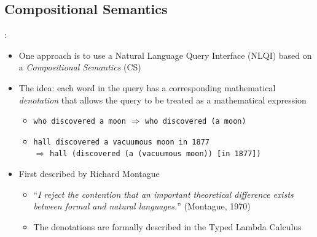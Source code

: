 \documentclass[logoontitle,tabu,supertabular,aspectratio=43]{preney-uwindsor-beamer}
\begin{document}
    \subsection{Compositional Semantics}
    \begin{frame}{\insertsection: \insertsubsection}
        \begin{itemize}
            \item One approach is to use a Natural Language Query Interface (NLQI) based on a {\em Compositional Semantics} (CS)
            \item The idea: each word in the query has a corresponding mathematical {\em denotation} that allows the query to be treated as a mathematical expression
            \begin{itemize}
                \item \texttt{who discovered a moon} $\Rightarrow$ \texttt{who discovered (a moon)}
                \item \texttt{hall discovered a vacuumous moon in 1877} \\ $\Rightarrow$ \texttt{hall (discovered (a (vacuumous moon)) [in 1877])}
            \end{itemize}
            \item First described by Richard Montague \cite{Dowty:wall}
            \begin{itemize}
                \item ``\textit{I reject the contention that an important theoretical difference exists between formal and natural languages.}'' (Montague, 1970)
                \item The denotations are formally described in the Typed Lambda Calculus
            \end{itemize}
        \end{itemize}
    \end{frame}
\end{document}
